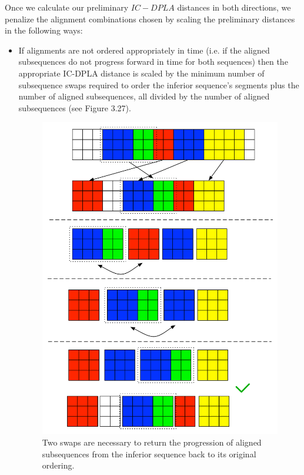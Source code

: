\documentclass[a4paper,12pt]{report} 	%
\numberwithin{figure}{chapter}
\numberwithin{table}{chapter}
\numberwithin{equation}{chapter}
\begin{document}
\begin{flushleft}
Once we calculate our preliminary $IC-DPLA$ distances in both directions, we penalize the alignment combinations chosen by scaling the preliminary distances in the following ways:
\begin{itemize}
\item If alignments are not ordered appropriately in time (i.e. if the aligned subsequences do not progress forward in time for both sequences) then the appropriate IC-DPLA distance is scaled by the minimum number of subsequence swaps required to order the inferior sequence's segments plus the number of aligned subsequences, all divided by the number of aligned subsequences (see Figure 3.27). 
\begin{figure}[h!]
\begin{center}
\includegraphics[scale=0.7]{Penalty_1}
\caption[Penalizing Swaps]{Two swaps are necessary to return the progression of aligned subsequences from the inferior sequence back to its original ordering.}
\end{center}

\end{figure}
\end{itemize}
\end{flushleft}
\end{document}
